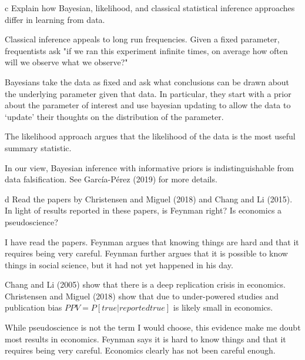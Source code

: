 \documentclass{article}
\begin{document}
\clearpage
\begin{problem}{c}
Explain how Bayesian, likelihood, and classical statistical inference approaches differ in learning from data.
\end{problem}

\begin{solution}

Classical inference appeals to long run frequencies. Given a fixed parameter, frequentists ask "if we ran this experiment infinite times, on average how often will we observe what we observe?"

Bayesians take the data as fixed and ask what conclusions can be drawn about the underlying parameter given that data. In particular, they start with a prior about the parameter of interest and use bayesian updating to allow the data to `update' their thoughts on the distribution of the parameter. 

The likelihood approach argues that the likelihood of the data is the most useful summary statistic. 

In our view, Bayesian inference with informative priors is indistinguishable from data falsification. See  García-Pérez (2019) for more details. 
\end{solution}

\begin{problem}{d}
 Read the papers by Christensen and Miguel (2018) and Chang and Li (2015). In light of results reported in these papers, is Feynman right? Is economics a pseudoscience?
\end{problem}

\begin{solution}
I have read the papers. Feynman argues that knowing things are hard and that it requires being very careful. Feynman further argues that it is possible to know things in social science, but it had not yet happened in his day. 

Chang and Li (2005) show that there is a deep replication crisis in economics. Christensen and Miguel (2018) show that due to under-powered studies and publication bias $PPV=P[true|reported true]$ is likely small in economics. 

While pseudoscience is not the term I would choose, this evidence make me doubt most results in economics. Feynman says it is hard to know things and that it requires being very careful. Economics clearly has not been careful enough. 

\end{solution}
\end{document}
